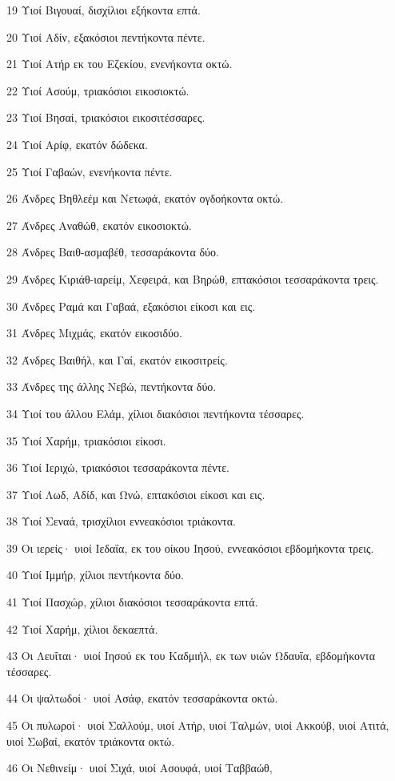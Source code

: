 \par 19 Υιοί Βιγουαί, δισχίλιοι εξήκοντα επτά.
\par 20 Υιοί Αδίν, εξακόσιοι πεντήκοντα πέντε.
\par 21 Υιοί Ατήρ εκ του Εζεκίου, ενενήκοντα οκτώ.
\par 22 Υιοί Ασούμ, τριακόσιοι εικοσιοκτώ.
\par 23 Υιοί Βησαί, τριακόσιοι εικοσιτέσσαρες.
\par 24 Υιοί Αρίφ, εκατόν δώδεκα.
\par 25 Υιοί Γαβαών, ενενήκοντα πέντε.
\par 26 Άνδρες Βηθλεέμ και Νετωφά, εκατόν ογδοήκοντα οκτώ.
\par 27 Άνδρες Αναθώθ, εκατόν εικοσιοκτώ.
\par 28 Άνδρες Βαιθ-ασμαβέθ, τεσσαράκοντα δύο.
\par 29 Άνδρες Κιριάθ-ιαρείμ, Χεφειρά, και Βηρώθ, επτακόσιοι τεσσαράκοντα τρεις.
\par 30 Άνδρες Ραμά και Γαβαά, εξακόσιοι είκοσι και εις.
\par 31 Άνδρες Μιχμάς, εκατόν εικοσιδύο.
\par 32 Άνδρες Βαιθήλ, και Γαί, εκατόν εικοσιτρείς.
\par 33 Άνδρες της άλλης Νεβώ, πεντήκοντα δύο.
\par 34 Υιοί του άλλου Ελάμ, χίλιοι διακόσιοι πεντήκοντα τέσσαρες.
\par 35 Υιοί Χαρήμ, τριακόσιοι είκοσι.
\par 36 Υιοί Ιεριχώ, τριακόσιοι τεσσαράκοντα πέντε.
\par 37 Υιοί Λωδ, Αδίδ, και Ωνώ, επτακόσιοι είκοσι και εις.
\par 38 Υιοί Σεναά, τρισχίλιοι εννεακόσιοι τριάκοντα.
\par 39 Οι ιερείς· υιοί Ιεδαΐα, εκ του οίκου Ιησού, εννεακόσιοι εβδομήκοντα τρεις.
\par 40 Υιοί Ιμμήρ, χίλιοι πεντήκοντα δύο.
\par 41 Υιοί Πασχώρ, χίλιοι διακόσιοι τεσσαράκοντα επτά.
\par 42 Υιοί Χαρήμ, χίλιοι δεκαεπτά.
\par 43 Οι Λευΐται· υιοί Ιησού εκ του Καδμιήλ, εκ των υιών Ωδαυΐα, εβδομήκοντα τέσσαρες.
\par 44 Οι ψαλτωδοί· υιοί Ασάφ, εκατόν τεσσαράκοντα οκτώ.
\par 45 Οι πυλωροί· υιοί Σαλλούμ, υιοί Ατήρ, υιοί Ταλμών, υιοί Ακκούβ, υιοί Ατιτά, υιοί Σωβαί, εκατόν τριάκοντα οκτώ.
\par 46 Οι Νεθινείμ· υιοί Σιχά, υιοί Ασουφά, υιοί Ταββαώθ,
